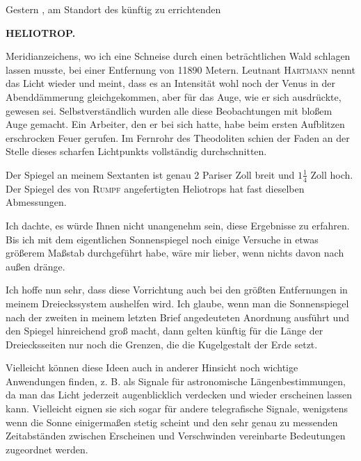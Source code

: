\par\noindent\hspace*{\parindent}Gestern , am Standort des künftig zu errichtenden 

\par\clearpage
\noindent\null\hfill{\small\textbf{HELIOTROP.}}\hfill{}\par\medskip
\noindent{} Meridianzeichens, wo ich eine Schneise durch einen beträchtlichen Wald schlagen lassen musste, bei einer Entfernung von 11890 Metern. Leutnant \textsc{Hartmann} nennt das Licht wieder  und meint, dass es an Intensität wohl noch der Venus in der Abenddämmerung gleichgekommen, aber für das Auge, wie er sich ausdrückte,  gewesen sei. Selbstverständlich wurden alle diese Beobachtungen mit bloßem Auge gemacht. Ein Arbeiter, den er bei sich hatte, habe beim ersten Aufblitzen erschrocken Feuer gerufen. Im Fernrohr des Theodoliten schien der Faden an der Stelle dieses scharfen Lichtpunkts vollständig durchschnitten.

\par\noindent\hspace*{\parindent}Der Spiegel an meinem Sextanten ist genau 2 Pariser Zoll breit und $1\frac14$ Zoll hoch. Der Spiegel des von \textsc{Rumpf} angefertigten Heliotrops hat fast dieselben Abmessungen.

\par\noindent\hspace*{\parindent}Ich dachte, es würde Ihnen nicht unangenehm sein, diese Ergebnisse zu erfahren. Bis ich mit dem eigentlichen Sonnenspiegel noch einige Versuche in etwas größerem Maßstab durchgeführt habe, wäre mir lieber, wenn nichts davon nach außen dränge.

\par\noindent\hspace*{\parindent}Ich hoffe nun sehr, dass diese Vorrichtung auch bei den größten Entfernungen in meinem Dreieckssystem aushelfen wird. Ich glaube, wenn man die Sonnenspiegel nach der zweiten in meinem letzten Brief angedeuteten Anordnung ausführt und den Spiegel hinreichend groß macht, dann gelten künftig für die Länge der Dreiecksseiten nur noch die Grenzen, die die Kugelgestalt der Erde setzt.

\par\noindent\hspace*{\parindent}Vielleicht können diese Ideen auch in anderer Hinsicht noch wichtige Anwendungen finden, z. B. als Signale für astronomische Längenbestimmungen, da man das Licht jederzeit augenblicklich verdecken und wieder erscheinen lassen kann. Vielleicht eignen sie sich sogar für andere telegrafische Signale, wenigstens wenn die Sonne einigermaßen stetig scheint und den sehr genau zu messenden Zeitabständen zwischen Erscheinen und Verschwinden vereinbarte Bedeutungen zugeordnet werden.

